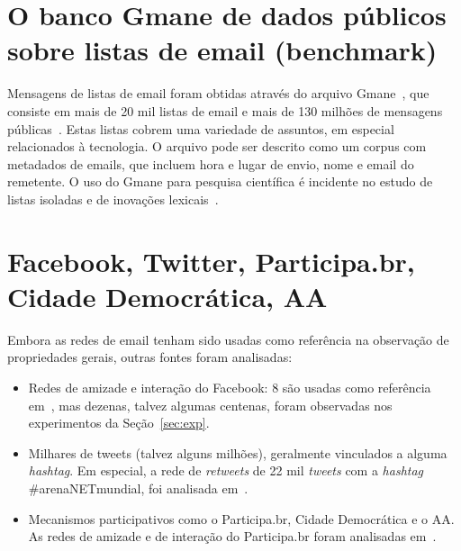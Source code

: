 \documentclass[a4paper,openright,12pt]{report} %
\begin{document}
\section{O banco Gmane de dados públicos sobre listas de email (benchmark)}
Mensagens de listas de email foram obtidas através do arquivo Gmane~\cite{gmanePack},
que consiste em mais de 20 mil listas de email e mais de 130 milhões de mensagens públicas~\cite{GMANEwikipedia}.
Estas listas cobrem uma variedade de assuntos, em especial
relacionados à tecnologia. O arquivo pode ser descrito como
um corpus com metadados de emails, que incluem hora e lugar
de envio, nome e email do remetente. O uso do Gmane para
pesquisa científica é incidente no estudo de listas isoladas
e de inovações lexicais~\cite{GMANE2,bird}. 

\section{Facebook, Twitter, Participa.br, Cidade Democrática, AA}
Embora as redes de email tenham sido usadas como referência
na observação de propriedades gerais, outras fontes
foram analisadas:

\begin{itemize}
    \item Redes de amizade e interação do Facebook: 8 são usadas como referência em~\cite{timeS}, mas dezenas, talvez algumas centenas, foram observadas nos experimentos da Seção~\ref{sec:exp}.
    \item Milhares de tweets (talvez alguns milhões), geralmente vinculados a alguma \emph{hashtag}. Em especial, a rede de \emph{retweets} de 22 mil \emph{tweets} com a \emph{hashtag} \#arenaNETmundial, foi analisada em~\cite{timeS}.
    \item Mecanismos participativos como o Participa.br, Cidade Democrática e o AA. As redes de amizade e de interação do Participa.br foram analisadas em~\cite{timeS}.
\end{itemize}
\end{document}
